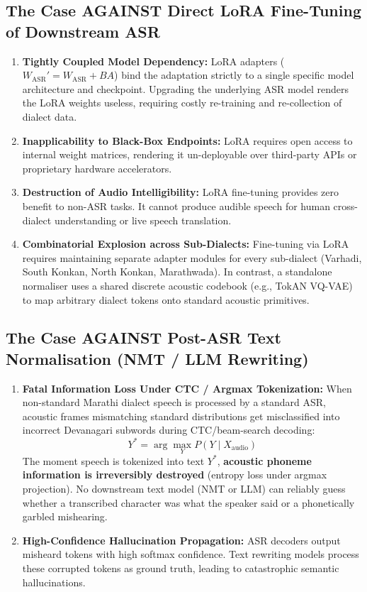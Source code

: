 \documentclass[11pt]{article}
\begin{document}
\subsection{The Case AGAINST Direct LoRA Fine-Tuning of Downstream ASR}
\begin{enumerate}[leftmargin=*]
  \item \textbf{Tightly Coupled Model Dependency:}
    LoRA adapters ($W_{\text{ASR}}' = W_{\text{ASR}} + BA$) bind the adaptation strictly to a single specific model architecture and checkpoint. Upgrading the underlying ASR model renders the LoRA weights useless, requiring costly re-training and re-collection of dialect data.
  \item \textbf{Inapplicability to Black-Box Endpoints:}
    LoRA requires open access to internal weight matrices, rendering it un-deployable over third-party APIs or proprietary hardware accelerators.
  \item \textbf{Destruction of Audio Intelligibility:}
    LoRA fine-tuning provides zero benefit to non-ASR tasks. It cannot produce audible speech for human cross-dialect understanding or live speech translation.
  \item \textbf{Combinatorial Explosion across Sub-Dialects:}
    Fine-tuning via LoRA requires maintaining separate adapter modules for every sub-dialect (Varhadi, South Konkan, North Konkan, Marathwada). In contrast, a standalone normaliser uses a shared discrete acoustic codebook (e.g., TokAN VQ-VAE) to map arbitrary dialect tokens onto standard acoustic primitives.
\end{enumerate}

\subsection{The Case AGAINST Post-ASR Text Normalisation (NMT / LLM Rewriting)}
\begin{enumerate}[leftmargin=*]
  \item \textbf{Fatal Information Loss Under CTC / Argmax Tokenization:}
    When non-standard Marathi dialect speech is processed by a standard ASR, acoustic frames mismatching standard distributions get misclassified into incorrect Devanagari subwords during CTC/beam-search decoding:
    \[
    Y^* = \arg\max_Y P(Y \mid X_{\text{audio}})
    \]
    The moment speech is tokenized into text $Y^*$, \textbf{acoustic phoneme information is irreversibly destroyed} (entropy loss under argmax projection). No downstream text model (NMT or LLM) can reliably guess whether a transcribed character was what the speaker said or a phonetically garbled mishearing.
  \item \textbf{High-Confidence Hallucination Propagation:}
    ASR decoders output misheard tokens with high softmax confidence. Text rewriting models process these corrupted tokens as ground truth, leading to catastrophic semantic hallucinations.
\end{enumerate}
\end{document}
